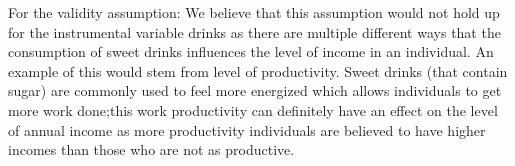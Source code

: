 For the validity assumption: We believe that this assumption would not hold up for the instrumental variable drinks as there are multiple different ways that the consumption of sweet drinks influences the level of income in an individual. An example of this would stem from level of productivity. Sweet drinks (that contain sugar) are commonly used to feel more energized which allows individuals to get more work done;this work productivity can definitely have an effect on the level of annual income as more productivity individuals are believed to have higher incomes than those who are not as productive.